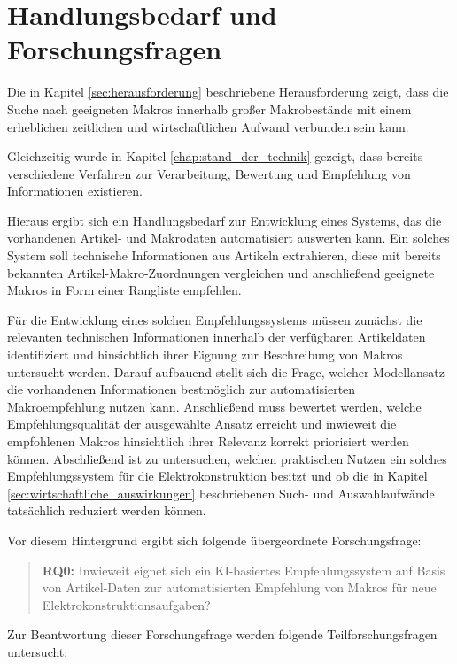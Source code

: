 \section{Handlungsbedarf und Forschungsfragen}
\label{sec:handlungsbedarf_und_forschungsfragen} 

Die in Kapitel \ref{sec:herausforderung} beschriebene Herausforderung zeigt, dass die Suche nach geeigneten Makros innerhalb großer Makrobestände mit einem erheblichen zeitlichen und wirtschaftlichen Aufwand verbunden sein kann. 

Gleichzeitig wurde in Kapitel \ref{chap:stand_der_technik} gezeigt, dass bereits verschiedene Verfahren zur Verarbeitung, Bewertung und Empfehlung von Informationen existieren. 

Hieraus ergibt sich ein Handlungsbedarf zur Entwicklung eines Systems, das die vorhandenen Artikel- und Makrodaten automatisiert auswerten kann. 
Ein solches System soll technische Informationen aus Artikeln extrahieren, diese mit bereits bekannten Artikel-Makro-Zuordnungen vergleichen und anschließend geeignete Makros in Form einer Rangliste empfehlen. 

Für die Entwicklung eines solchen Empfehlungssystems müssen zunächst die relevanten technischen Informationen innerhalb der verfügbaren Artikeldaten identifiziert und hinsichtlich ihrer Eignung zur Beschreibung von Makros untersucht werden. 
Darauf aufbauend stellt sich die Frage, welcher Modellansatz die vorhandenen Informationen bestmöglich zur automatisierten Makroempfehlung nutzen kann. 
Anschließend muss bewertet werden, welche Empfehlungsqualität der ausgewählte Ansatz erreicht und inwieweit die empfohlenen Makros hinsichtlich ihrer Relevanz korrekt priorisiert werden können. 
Abschließend ist zu untersuchen, welchen praktischen Nutzen ein solches Empfehlungssystem für die Elektrokonstruktion besitzt und ob die in Kapitel \ref{sec:wirtschaftliche_auswirkungen} beschriebenen Such- und Auswahlaufwände tatsächlich reduziert werden können. 

Vor diesem Hintergrund ergibt sich folgende übergeordnete Forschungsfrage: 

\begin{quote} 
  \textbf{RQ0:} Inwieweit eignet sich ein KI-basiertes Empfehlungssystem auf Basis von Artikel-Daten zur automatisierten Empfehlung von Makros für neue Elektrokonstruktionsaufgaben? 
\end{quote} 

Zur Beantwortung dieser Forschungsfrage werden folgende Teilforschungsfragen untersucht: 

